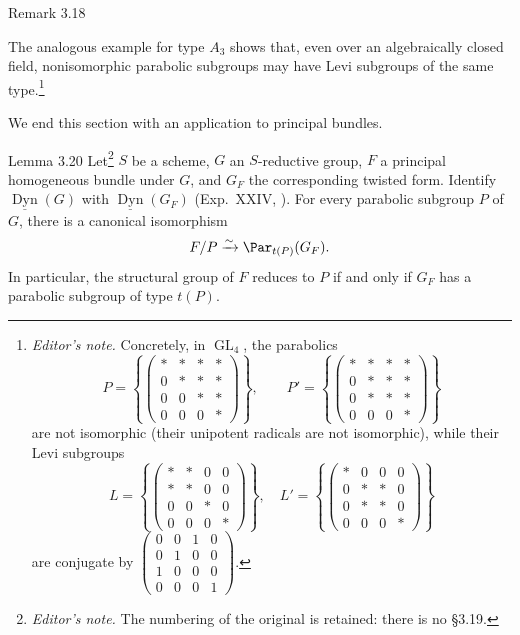 \begin{sgastatement}{Remark 3.18}
\begin{enumerate}[label=\textup{(\roman*)}]
The analogous example for type \(A_3\) shows that, even over an
algebraically closed field, nonisomorphic parabolic subgroups may have
Levi subgroups of the same type.\footnote{\emph{Editor's note.}
Concretely, in \(\operatorname{GL}_4\), the parabolics
\[
 P=\left\{\begin{pmatrix}
 *&*&*&*\\0&*&*&*\\0&0&*&*\\0&0&0&*
 \end{pmatrix}\right\},
 \qquad
 P'=\left\{\begin{pmatrix}
 *&*&*&*\\0&*&*&*\\0&*&*&*\\0&0&0&*
 \end{pmatrix}\right\}
\]
are not isomorphic (their unipotent radicals are not isomorphic), while
their Levi subgroups
\[
 L=\left\{\begin{pmatrix}
 *&*&0&0\\ *&*&0&0\\0&0&*&0\\0&0&0&*
 \end{pmatrix}\right\},
 \quad
 L'=\left\{\begin{pmatrix}
 *&0&0&0\\0&*&*&0\\0&*&*&0\\0&0&0&*
 \end{pmatrix}\right\}
\]
are conjugate by
\(
\left(\begin{smallmatrix}
0&0&1&0\\0&1&0&0\\1&0&0&0\\0&0&0&1
\end{smallmatrix}\right).
\)}
\end{enumerate}
\end{sgastatement}

We end this section with an application to principal bundles.

\begin{sgastatement}{Lemma 3.20}
Let\footnote{\emph{Editor's note.} The numbering of the original is
retained: there is no §3.19.} \(S\) be a scheme, \(G\) an \(S\)-reductive group, \(F\) a principal
homogeneous bundle under \(G\), and \(G_F\) the corresponding twisted form.
Identify \(\underline{\operatorname{Dyn}}(G)\) with
\(\underline{\operatorname{Dyn}}(G_F)\) \textup{(Exp.\ XXIV, )}.
For every parabolic subgroup \(P\) of \(G\), there is a canonical
isomorphism
\[
 F/P\xrightarrow{\sim}\Par_{t(P)}(G_F).
\]
In particular, the structural group of \(F\) reduces to \(P\) if and only
if \(G_F\) has a parabolic subgroup of type \(t(P)\).
\end{sgastatement}

